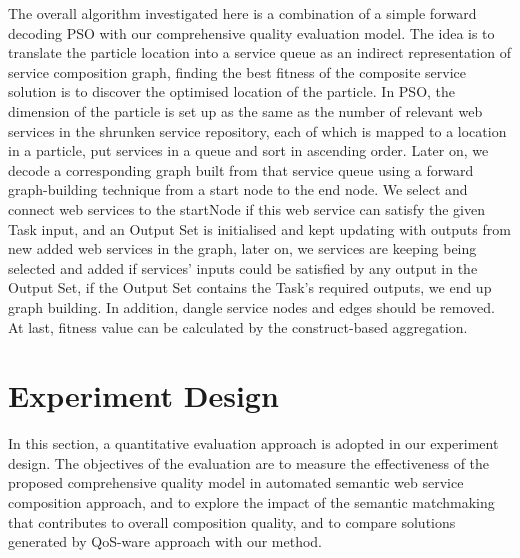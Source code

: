 \documentclass{llncs}
\begin{document}
The overall algorithm investigated here is a combination of a simple forward decoding PSO \cite{da2016particle} with our comprehensive quality evaluation model. The idea is to translate the particle location into a service queue as an indirect representation of service composition graph, finding the best fitness of the composite service solution is to discover the optimised location of the particle. In PSO, the dimension of the particle is set up as the same as the number of relevant web services in the shrunken service repository, each of which is mapped to a location in a particle, put services in a queue and sort in ascending order. Later on, we decode a corresponding graph built from that service queue using a forward graph-building technique from a start node to the end node. We select and connect web services to the startNode if this web service can satisfy the given Task input, and an Output Set is initialised and kept updating with outputs from new added web services in the graph, later on, we services are keeping being selected and added if services' inputs could be satisfied by any output in the Output Set, if the Output Set contains the Task's required outputs, we end up graph building. In addition, dangle service nodes and edges should be removed. At last, fitness value can be calculated by the construct-based aggregation.



\section{Experiment Design}\label{experiment_design}
In this section, a quantitative evaluation approach is adopted in our experiment design. The objectives of the evaluation are to measure the effectiveness of the proposed comprehensive quality model in automated semantic web service composition approach, and to explore the impact of the semantic matchmaking that contributes to overall composition quality, and to compare solutions generated by QoS-ware approach with our method.
\end{document}
